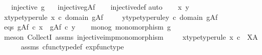 \begin{isabellebody}
\ \ \ {\isachardoublequoteopen}injective\ g{\isachardoublequoteclose}\isanewline
\ \ \ {\isachardoublequoteopen}injective{\isacharparenleft}{\kern0pt}g\isactrlbsup A\isactrlesup \isactrlsub f{\isacharparenright}{\kern0pt}{\isachardoublequoteclose}\isanewline
%
\isadelimproof
\ \ %
\endisadelimproof
%
\isatagproof
{}\isamarkupfalse%
\ injective{\isacharunderscore}{\kern0pt}def\isanewline
{}\isamarkupfalse%
{\isacharparenleft}{\kern0pt}auto{\isacharparenright}{\kern0pt}\isanewline
\ \ \isamarkupfalse%
\ x\ y\ \isanewline
\ \ \isamarkupfalse%
\ x{\isacharunderscore}{\kern0pt}type{\isacharbrackleft}{\kern0pt}type{\isacharunderscore}{\kern0pt}rule{\isacharbrackright}{\kern0pt}{\isacharcolon}{\kern0pt}\ {\isachardoublequoteopen}x\ {\isasymin}\isactrlsub c\ domain\ {\isacharparenleft}{\kern0pt}g\isactrlbsup A\isactrlesup \isactrlsub f{\isacharparenright}{\kern0pt}{\isachardoublequoteclose}\ \isanewline
\ \ \isamarkupfalse%
\ y{\isacharunderscore}{\kern0pt}type{\isacharbrackleft}{\kern0pt}type{\isacharunderscore}{\kern0pt}rule{\isacharbrackright}{\kern0pt}{\isacharcolon}{\kern0pt}{\isachardoublequoteopen}y\ {\isasymin}\isactrlsub c\ domain\ {\isacharparenleft}{\kern0pt}g\isactrlbsup A\isactrlesup \isactrlsub f{\isacharparenright}{\kern0pt}{\isachardoublequoteclose}\isanewline
\ \ \isamarkupfalse%
\ eqs{\isacharcolon}{\kern0pt}\ {\isachardoublequoteopen}g\isactrlbsup A\isactrlesup \isactrlsub f\ {\isasymcirc}\isactrlsub c\ x\ {\isacharequal}{\kern0pt}\ g\isactrlbsup A\isactrlesup \isactrlsub f\ {\isasymcirc}\isactrlsub c\ y{\isachardoublequoteclose}\isanewline
\ \ \isamarkupfalse%
\ mono{\isacharunderscore}{\kern0pt}g{\isacharcolon}{\kern0pt}\ {\isachardoublequoteopen}monomorphism\ g{\isachardoublequoteclose}\isanewline
\ \ \ \ \isamarkupfalse%
\ {\isacharparenleft}{\kern0pt}meson\ CollectI\ assms{\isacharparenleft}{\kern0pt}{}{\isacharparenright}{\kern0pt}\ injective{\isacharunderscore}{\kern0pt}imp{\isacharunderscore}{\kern0pt}monomorphism{\isacharparenright}{\kern0pt}\ \isanewline
\ \ \isamarkupfalse%
\ x{\isacharunderscore}{\kern0pt}type{\isacharprime}{\kern0pt}{\isacharbrackleft}{\kern0pt}type{\isacharunderscore}{\kern0pt}rule{\isacharbrackright}{\kern0pt}{\isacharcolon}{\kern0pt}\ {\isachardoublequoteopen}x\ {\isasymin}\isactrlsub c\ \ X\isactrlbsup A\isactrlesup {\isachardoublequoteclose}\isanewline
\ \ \ \ \isamarkupfalse%
\ assms{\isacharparenleft}{\kern0pt}{}{\isacharparenright}{\kern0pt}\ cfunc{\isacharunderscore}{\kern0pt}type{\isacharunderscore}{\kern0pt}def\ exp{\isacharunderscore}{\kern0pt}func{\isacharunderscore}{\kern0pt}type\ \isamarkupfalse%

\end{isabellebody}
